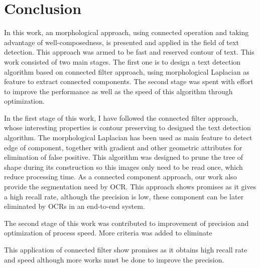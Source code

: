
\graphicspath{ {7chapterConclusion/image/} }
\chapter{Conclusion}


In this work, an morphological approach, using connected operation and taking advantage of well-composedness, is presented and applied in the field of text detection. This approach was armed to be fast and reserved contour of text. This work consisted of two main stages. The first one is to design a text detection algorithm based on connected filter approach, using morphological Laplacian as feature to extract connected components. The second stage was spent with effort to improve the performance as well as the speed of this algorithm through optimization. 

In the first stage of this work, I have followed the connected filter approach, whose interesting properties is contour preserving to designed the text detection algorithm. The morphological Laplacian has been used as main feature to detect edge of component, together with gradient and other geometric attributes for elimination of false positive. This algorithm was designed to prune the tree of shape during its construction so this images only need to be read once, which reduce processing time. As a connected component approach, our work also provide the segmentation need by OCR. This approach shows promises as it gives a high recall rate, although the precision is low, these component can be later eliminated by OCRs in an end-to-end system.
  

The second stage of this work was contributed to improvement of precision and optimization of process speed. More criteria was added to eliminate 

This application of connected filter show promises as it obtains high recall rate and speed although more works must be done to improve the precision. 

 


